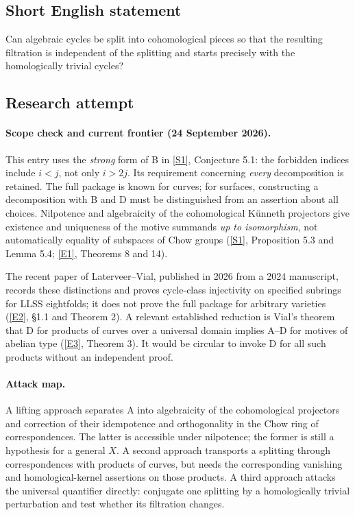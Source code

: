 \documentclass[11pt]{article}
\newcommand{\sref}[2]{\hyperlink{source:#1:#2}{[S#2]}}
\newcommand{\eref}[2]{\hyperlink{extra:#1:#2}{[E#2]}}
\begin{document}
\subsection{Short English statement}
Can algebraic cycles be split into cohomological pieces so that the resulting filtration is independent of the splitting and starts precisely with the homologically trivial cycles?
\subsection{Research attempt}

\paragraph{Scope check and current frontier (24 September 2026).}
This entry uses the \emph{strong} form of B in \sref{30006755}{1}, Conjecture 5.1:
the forbidden indices include $i<j$, not only $i>2j$.  Its requirement concerning
\emph{every} decomposition is retained.  The full package is known for curves;
for surfaces, constructing a decomposition with B and D must be distinguished
from an assertion about all choices.  Nilpotence and algebraicity of the
cohomological K\"unneth projectors give existence and uniqueness of the motive
summands \emph{up to isomorphism}, not automatically equality of subspaces of
Chow groups (\sref{30006755}{1}, Proposition 5.3 and Lemma 5.4;
\eref{30006755}{1}, Theorems 8 and 14).

The recent paper of Laterveer--Vial, published in 2026 from a 2024 manuscript,
records these distinctions and proves cycle-class injectivity on specified
subrings for LLSS eightfolds; it does not prove the full package for arbitrary
varieties (\eref{30006755}{2}, \S1.1 and Theorem 2).
A relevant established reduction is Vial's theorem that D for products of
curves over a universal domain implies A--D for motives of abelian type
(\eref{30006755}{3}, Theorem 3).  It would be circular to invoke D for all such
products without an independent proof.

\paragraph{Attack map.}
A lifting approach separates A into algebraicity of the cohomological
projectors and correction of their idempotence and orthogonality in the Chow
ring of correspondences.  The latter is accessible under nilpotence; the
former is still a hypothesis for a general $X$.  A second approach transports
a splitting through correspondences with products of curves, but needs the
corresponding vanishing and homological-kernel assertions on those products.
A third approach attacks the universal quantifier directly: conjugate one
splitting by a homologically trivial perturbation and test whether its
filtration changes.
\end{document}
